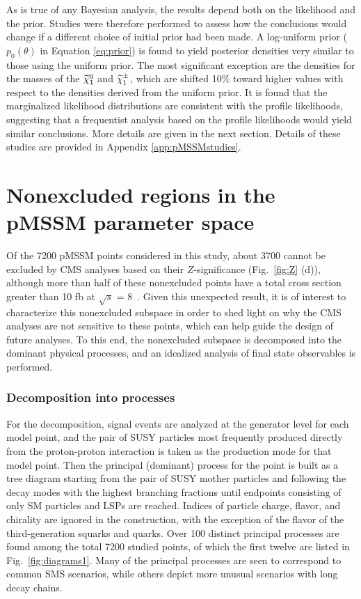 As is true of any Bayesian analysis, the results depend both on the likelihood and the prior. Studies were therefore performed to assess how the conclusions would change if a 
different choice of initial prior had been made. A log-uniform prior ($p_0(\theta)$ in Equation \ref{eq:prior}) is found to yield posterior densities very similar to those using the uniform prior. The most significant exception are 
the densities for the masses of the $\widetilde{\chi}^0_1$ and  $\widetilde{\chi}^\pm_1$, which are shifted 10\% 
toward higher values with respect to the densities derived from the
uniform prior. It is found that the marginalized 
likelihood distributions are consistent with the profile likelihoods, suggesting that a 
frequentist analysis based on the profile likelihoods would yield similar conclusions. More details are given in the next section. Details of these studies are provided in Appendix \ref{app:pMSSMstudies}.

\section{Nonexcluded regions in the pMSSM parameter space}
\label{sec:unexplored}

Of the 7200 pMSSM points considered in this study, about 3700 cannot be
excluded by CMS analyses based on their $Z$-significance (Fig.~\ref{fig:Z} (d)), although more
than half of these nonexcluded points have a total cross section greater than 10 fb at $\sqrt{s}$ = 8~\TeV.
Given this unexpected result, it is of interest to characterize this nonexcluded
subspace in order to shed light on why the CMS analyses are not
sensitive to these points, which can help guide the design of future analyses. To this end, the nonexcluded subspace is decomposed into the dominant physical processes, and an idealized analysis of final state
observables is performed.

\subsubsection{Decomposition into processes}
For the decomposition, signal events are analyzed at the generator
level for each model point, and the pair of SUSY particles most frequently produced directly
from the proton-proton interaction is taken as the production 
mode for that model point. Then the principal (dominant) process for
the point is built as a tree diagram starting from the pair of SUSY mother
particles and following the decay modes with the highest branching
fractions until endpoints consisting of only SM particles
and LSPs are reached. Indices of particle charge, flavor,  and chirality are ignored in the
construction, with the exception of the flavor of the third-generation squarks and quarks.
Over 100 distinct principal processes are found
among the total 7200 studied points, of which the first twelve
are listed in Fig.~\ref{fig:diagrams1}. Many
of the principal processes are seen to correspond to common SMS scenarios, while others
depict more unusual scenarios with long decay chains. 

